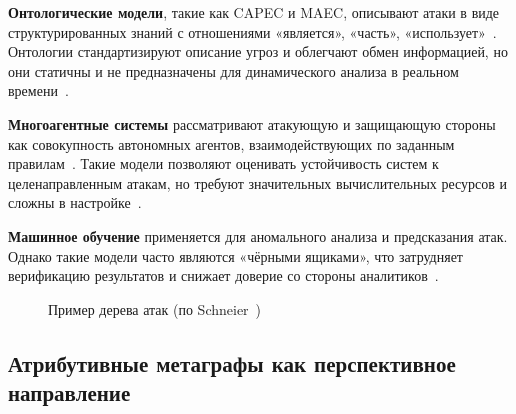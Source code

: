 \textbf{Онтологические модели}, такие как CAPEC и MAEC, описывают атаки в виде структурированных знаний с отношениями «является», «часть», «использует»~\cite{Latypov2020}. Онтологии стандартизируют описание угроз и облегчают обмен информацией, но они статичны и не предназначены для динамического анализа в реальном времени~\cite{Gorbachev2018}.

\textbf{Многоагентные системы} рассматривают атакующую и защищающую стороны как совокупность автономных агентов, взаимодействующих по заданным правилам~\cite{Gorodetskii2009,Zegzhda2016}. Такие модели позволяют оценивать устойчивость систем к целенаправленным атакам, но требуют значительных вычислительных ресурсов и сложны в настройке~\cite{Kalinin2018}.

\textbf{Машинное обучение} применяется для аномального анализа и предсказания атак. Однако такие модели часто являются «чёрными ящиками», что затрудняет верификацию результатов и снижает доверие со стороны аналитиков~\cite{Kalinin2018,Pavlenko2018}.

\begin{figure}[h]
\centering
{}
\caption{Пример дерева атак (по Schneier~\cite{Schneier1999})}
\label{fig:attack_tree_example}
\end{figure}

\subsection{Атрибутивные метаграфы как перспективное направление}

